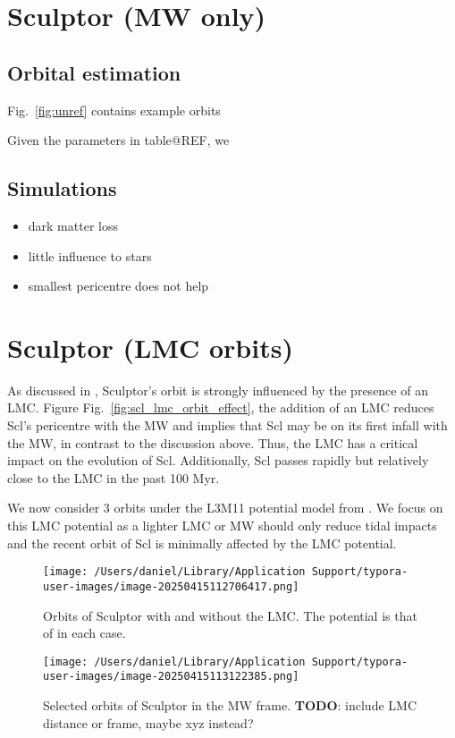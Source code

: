 \section{Sculptor (MW only)}\label{sculptor-mw-only}

\subsection{Orbital estimation}\label{orbital-estimation}

Fig.~\ref{fig:unref} contains example orbits

Given the parameters in table@REF, we

\subsection{Simulations}\label{simulations}

\begin{itemize}
\tightlist
\item
  dark matter loss
\item
  little influence to stars
\item
  smallest pericentre does not help
\end{itemize}

\section{Sculptor (LMC orbits)}\label{sculptor-lmc-orbits}

As discussed in \citet{battaglia+2022}, Sculptor's orbit is strongly
influenced by the presence of an LMC. Figure
Fig.~\ref{fig:scl_lmc_orbit_effect}, the addition of an LMC reduces
Scl's pericentre with the MW and implies that Scl may be on its first
infall with the MW, in contrast to the discussion above. Thus, the LMC
has a critical impact on the evolution of Scl. Additionally, Scl passes
rapidly but relatively close to the LMC in the past 100 Myr.

We now consider 3 orbits under the L3M11 potential model from
\citet{vasiliev2024}. We focus on this LMC potential as a lighter LMC or
MW should only reduce tidal impacts and the recent orbit of Scl is
minimally affected by the LMC potential.

\begin{figure}
\centering
\texttt{[image: /Users/daniel/Library/Application Support/typora-user-images/image-20250415112706417.png]}
\caption[Effect of LMC on Sculptor's Orbit]{Orbits of Sculptor with and
without the LMC. The potential is that of \citet{vasiliev+2021} in each
case.}
\end{figure}

\begin{figure}
\centering
\texttt{[image: /Users/daniel/Library/Application Support/typora-user-images/image-20250415113122385.png]}
\caption[Selected orbits of Sculptor with an LMC]{Selected orbits of
Sculptor in the MW frame. \textbf{TODO}: include LMC distance or frame,
maybe xyz instead?}
\end{figure}
